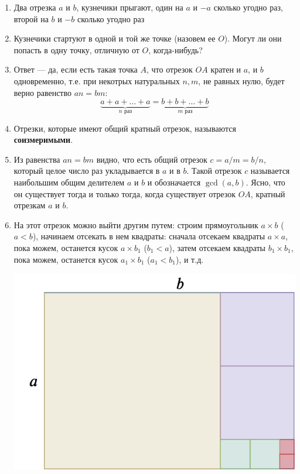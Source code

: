 \begin{enumerate}
\item Два отрезка $a$ и $b$, кузнечики прыгают, один на $a$ и $-a$ сколько угодно раз, второй на $b$ и $-b$ сколько угодно раз
\item Кузнечики стартуют в одной и той же точке (назовем ее $O$). Могут ли они попасть в одну точку, отличную от $O$, когда-нибудь?
\item Ответ --- да, если есть такая точка $A$, что отрезок $OA$ кратен и $a$, и $b$ одновременно, т.е. при некотрых натуральных $n,m$, не равных нулю, будет верно равенство $an=bm$:
$$
\underbrace{a+a+\dots+a}_{n\mbox{ раз}}=\underbrace{b+b+\dots+b}_{m\mbox{ раз}}
$$
\item Отрезки, которые имеют общий кратный отрезок, называются \textbf{соизмеримыми}.
\item Из равенства $an=bm$ видно, что есть общий отрезок $c=a/m=b/n$, который целое число раз укладывается в $a$ и в $b$. Такой отрезок $c$ называется наибольшим общим делителем $a$ и $b$ и обозначается $\gcd(a,b)$. Ясно, что он существует тогда и только тогда, когда существует отрезок $OA$, кратный отрезкам $a$ и $b$.
\item На этот отрезок можно выйти другим путем: строим прямоугольник $a\times b$ ($a<b$), начинаем отсекать в нем квадраты: сначала отсекаем квадраты $a\times a$, пока можем, останется кусок $a\times b_1$ ($b_1<a$), затем отсекаем квадраты $b_1\times b_1$, пока можем, останется кусок $a_1\times b_1$ ($a_1<b_1$), и т.д.
\begin{center}
\includegraphics[scale=0.3]{soizmer.png}
\end{center}


\end{enumerate}
